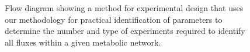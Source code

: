 \documentclass[10pt]{article}
\begin{document}
	\begin{figure}[!tbhp]
		\caption{Flow diagram showing a method for experimental design that uses our methodology for practical identification of parameters to determine the number and type of experiments required to identify all fluxes within a given metabolic network.}\label{fig:ident-design}
	\end{figure}
\end{document}
